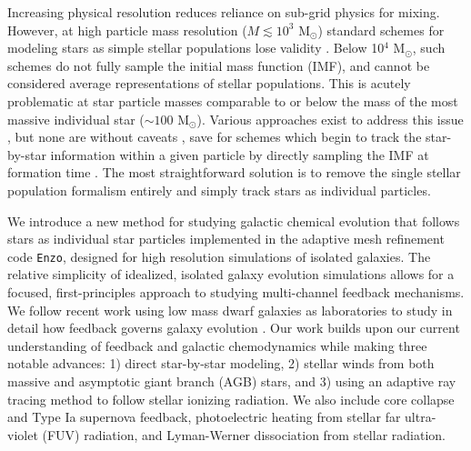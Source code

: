 \documentclass[twocolumn]{aastex61}
\begin{document}
Increasing physical resolution reduces reliance on sub-grid physics for mixing.  However, at high particle mass resolution ($M \lesssim 10^3$ M$_{\odot}$) standard schemes for modeling stars as simple stellar populations lose validity  \citep[as studied in detail by][]{Revaz2016}. Below 10$^4$ M$_{\odot}$, such schemes do not fully sample the initial mass function (IMF), and cannot be considered average representations of stellar populations. This is acutely problematic at star particle masses comparable to or below the mass of the most massive individual star ($\sim 100$ M$_{\odot}$). Various approaches exist to address this issue \citep[e.g.][]{Kobayashi2000,WeidnerKroupa2004,Pflamm-AltenburgKroupa2006,RevazJablonka2012,Kroupa2013,Rosdahl2015,Su2017b}, but none are without caveats \citep{Revaz2016}, save for schemes which begin to track the star-by-star information within a given particle by directly sampling the IMF at formation time \citep[e.g.][]{Hu2017}.  The most straightforward solution is to remove the single stellar population formalism entirely and simply track stars as individual particles. 
 
We introduce a new method for studying galactic chemical evolution that follows stars as individual star particles implemented in the adaptive mesh refinement code \texttt{Enzo}, designed for high resolution simulations of isolated galaxies. The relative simplicity of idealized, isolated galaxy evolution simulations allows for a focused, first-principles approach to studying multi-channel feedback mechanisms. We follow recent work using low mass dwarf galaxies as laboratories to study in detail how feedback governs galaxy evolution \citep{Forbes2016,Hu2016,Hu2017}.
Our work builds upon our current understanding of feedback and galactic chemodynamics while making three notable advances: 1) direct star-by-star modeling, 2) stellar winds from both massive and asymptotic giant branch (AGB) stars, and 3) using an adaptive ray tracing method to follow stellar ionizing radiation. We also include core collapse and Type Ia supernova feedback, photoelectric heating from stellar far ultra-violet (FUV) radiation, and Lyman-Werner dissociation from stellar radiation. 
\end{document}
